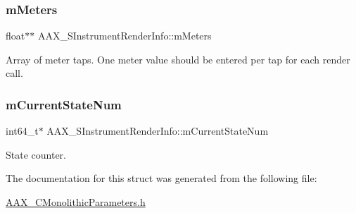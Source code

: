 \subsubsection{\texorpdfstring{mMeters}{mMeters}}
{\footnotesize\ttfamily float$\ast$$\ast$ A\+A\+X\+\_\+\+S\+Instrument\+Render\+Info\+::m\+Meters}



Array of meter taps. One meter value should be entered per tap for each render call. 

\mbox{\label{a01965_a846c5f9e518bb66bf1854a9eb77d54a7}} 
\subsubsection{\texorpdfstring{mCurrentStateNum}{mCurrentStateNum}}
{\footnotesize\ttfamily int64\+\_\+t$\ast$ A\+A\+X\+\_\+\+S\+Instrument\+Render\+Info\+::m\+Current\+State\+Num}



State counter. 



The documentation for this struct was generated from the following file\+:\begin{DoxyCompactItemize}
\item 
\mbox{\hyperlink{a00746}{A\+A\+X\+\_\+\+C\+Monolithic\+Parameters.\+h}}\end{DoxyCompactItemize}
